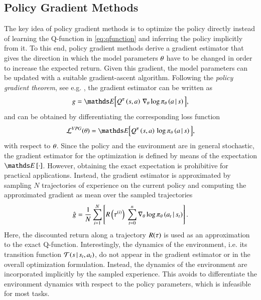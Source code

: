 \subsection{Policy Gradient Methods}
\label{sec:vpg}


The key idea of policy gradient methods is to optimize the policy directly instead of learning the Q-function in \eqref{eq:qfunction} and inferring the policy implicitly from it.
To this end, policy gradient methods derive a gradient estimator that gives the direction in which the model parameters $\theta$ have to be changed in order to increase the expected return.
Given this gradient, the model parameters can be updated with a suitable gradient-ascent algorithm.
Following the \textit{policy gradient theorem}, see e.g. \cite{sutton2018reinforcement}, the gradient estimator can be written as
\begin{equation}
  \policygradient = \expectation\Big[\qfunction^{\policy}\left(\state,\action\right) \,\nabla_{\modelparam}\log \policy_{\modelparam}\left(\action\sgiven\state \right) \Big],
  \label{eq:pg_gradient}
\end{equation}
and can be obtained by differentiating the corresponding loss function
\begin{equation}
  \loss^{VPG}(\modelparam) = \expectation\Big[ \qfunction^{\policy}\left(\state,\action\right) \,  \log \policy_{\modelparam}\left(\action\sgiven\state \right)\Big],
  \label{eq:pg_loss}
\end{equation}
with respect to $\theta$.
Since the policy and the environment are in general stochastic, the gradient estimator for the optimization is defined by means of the expectation $\expectation\left[\cdot\right]$.
However, obtaining the exact expectation is prohibitive for practical applications.
Instead, the gradient estimator is approximated by sampling $N$ trajectories of experience on the current policy and computing the approximated gradient as mean over the sampled trajectories
\begin{equation}
  \hat{\policygradient} = \frac{1}{N}\sum_{i=1}^N\left[\return\left(\traj^{(i)}\right) \ \sum_{t=0}^n  \nabla_{\modelparam}\log \policy_{\modelparam}\left(\action_t\sgiven\state_t \right)\right] \eqnperiod
  \label{eq:pg_approx_gradient}
\end{equation}
Here, the discounted return along a trajectory $R(\tau)$ is used as an approximation to the exact Q-function.
Interestingly, the dynamics of the environment, i.e. its transition function $\mathcal{T}(s \,|\, s_t ,a_t )$, do not appear in the gradient estimator or in the overall optimization formulation.
Instead, the dynamics of the environment are incorporated implicitly by the sampled experience.
This avoids to differentiate the environment dynamics with respect to the policy parameters, which is infeasible for most tasks.

